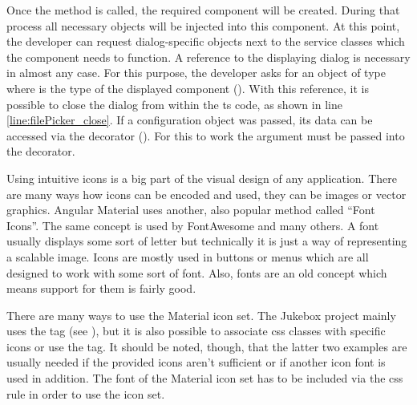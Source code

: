
Once the  method is called, the required component will be created. During that process all necessary objects will be injected into this component. At this point, the developer can request dialog-specific objects next to the service classes which the component needs to function. A reference to the displaying dialog is necessary in almost any case. For this purpose, the developer asks for an object of type  where  is the type of the displayed component (). With this reference, it is possible to close the dialog from within the \gls{ts} code, as shown in line \ref{line:filePicker_close}. If a configuration object was passed, its data can be accessed via the  decorator (). For this to work the  argument must be passed into the decorator. \cite{matDialog}



Using intuitive icons is a big part of the visual design of any application. There are many ways how icons can be encoded and used, \zB they can be images or vector graphics. Angular Material uses another, also popular method called \enquote{Font Icons}. The same concept is used by FontAwesome \cite{fontAwesome} and many others. A font usually displays some sort of letter but technically it is just a way of representing a scalable image. Icons are mostly used in buttons or menus which are all designed to work with some sort of font. Also, fonts are an old concept which means support for them is fairly good.

There are many ways to use the Material icon set. The Jukebox project mainly uses the  tag (see ), but it is also possible to associate \gls{css} classes with specific icons or use the  tag. It should be noted, though, that the latter two examples are usually needed if the provided icons aren't sufficient or if \zB another icon font is used in addition. The font of the Material icon set has to be included via the  \gls{css} rule in order to use the icon set.

